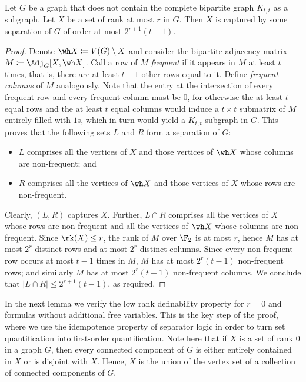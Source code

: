 \begin{lemma}\label{lem:characterization-separator}
 Let $G$ be a graph that does not contain the complete bipartite graph $K_{t,t}$ as a subgraph. Let $X$ be a set of rank at most $r$ in $G$. Then $X$ is captured by some separation of $G$ of order at most $2^{r+1}(t-1)$.
\end{lemma}
\begin{proof}
 Denote $\wh X\coloneqq V(G)\setminus X$ and consider the bipartite adjacency matrix $M\coloneqq \Adj_G[X,\wh X]$. Call a row of $M$ {\em{frequent}} if it appears in $M$ at least $t$ times, that is, there are at least $t-1$ other rows equal to it. Define {\em{frequent columns}} of $M$ analogously. Note that the entry at the intersection of every frequent row and every frequent column must be $0$, for otherwise the at least $t$ equal rows and the at least $t$ equal columns would induce a $t\times t$ submatrix of $M$ entirely filled with $1$s, which in turn would yield a $K_{t,t}$ subgraph in $G$. This proves that the following sets $L$ and $R$ form a separation of $G$:
 \begin{itemize}[nosep]
  \item $L$ comprises all the vertices of $X$ and those vertices of $\wh X$ whose columns are non-frequent; and
  \item $R$ comprises all the vertices of $\wh X$ and those vertices of $X$ whose rows are non-frequent.
 \end{itemize}
 Clearly, $(L,R)$ captures $X$. Further, $L\cap R$ comprises all the vertices of $X$ whose rows are non-frequent and all the vertices of $\wh X$ whose columns are non-frequent. Since $\rk(X)\leq r$, the rank of $M$ over $\F_2$ is at most $r$, hence $M$ has at most $2^r$ distinct rows and at most $2^r$ distinct columns. Since every non-frequent row occurs at most $t-1$ times in $M$, $M$ has at most $2^r(t-1)$ non-frequent rows; and similarly $M$ has at most $2^r(t-1)$ non-frequent columns. We conclude that $|L\cap R|\leq 2^{r+1}(t-1)$, as required.
\end{proof}

In the next lemma we verify the low rank definability property for $r=0$ and formulas without additional free variables. This is the key step of the proof, where we use the idempotence property of separator logic in order to turn set quantification into first-order quantification. Note here that if $X$ is a set of rank $0$ in a graph $G$, then every connected component of $G$ is either entirely contained in $X$ or is disjoint with $X$. Hence, $X$ is the union of the vertex set of a collection of connected components of $G$.

